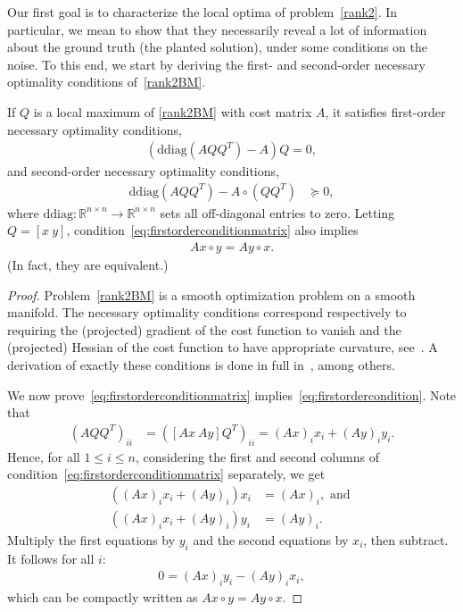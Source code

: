 \documentclass{colt2016} %
\newcommand{\Rnn}{{\mathbb{R}^{n\times n}}}
\newcommand{\1}{\mathbf{1}}
\newcommand{\ddiag}{\mathrm{ddiag}}
\begin{document}

Our first goal is to characterize the local optima of problem~\eqref{rank2}. In particular, we mean to show that they necessarily reveal a lot of information about the ground truth (the planted solution), under some conditions on the noise. To this end, we start by deriving the first- and second-order necessary optimality conditions of~\eqref{rank2BM}.

\begin{lemma} \label{lem:optimality}
	If $Q$ is a local maximum of \eqref{rank2BM} with cost matrix $A$, it satisfies first-order necessary optimality conditions,
	\begin{align}
	\left( \ddiag(AQQ^T) - A \right)Q = 0,
	\label{eq:firstorderconditionmatrix}
	\end{align}
	and second-order necessary optimality conditions,
	\begin{align}
	\ddiag(AQQ^T) - A\circ(QQ^T) & \succeq 0,
	\label{eq:secondorderconditionmatrix}
	\end{align}
	where $\ddiag \colon \Rnn \to \Rnn$ sets all off-diagonal entries to zero. Letting $Q = [x \ y]$, condition~\eqref{eq:firstorderconditionmatrix} also implies
	\begin{align}\label{eq:firstordercondition}
		Ax \circ y = Ay \circ x.
	\end{align}
	(In fact, they are equivalent.)
\end{lemma}
\begin{proof}
	Problem~\eqref{rank2BM} is a smooth optimization problem on a smooth manifold.
	The necessary optimality conditions correspond respectively to requiring the (projected) gradient of the cost function to vanish and the (projected) Hessian of the cost function to have appropriate curvature, see~\citep[eqs.(3.37,5.15)]{AMS08}. A derivation of exactly these conditions is done in full in~\citep{journee2010low,boumal2015staircase}, among others.
	
	We now prove~\eqref{eq:firstorderconditionmatrix} implies~\eqref{eq:firstordercondition}. Note that
	\begin{align*}
		(AQQ^T)_{ii} & = ([Ax \ Ay] Q^T)_{ii} = (Ax)_i x_i + (Ay)_i y_i.
	\end{align*}
	Hence, for all $1 \leq i \leq n$, considering the first and second columns of condition~\eqref{eq:firstorderconditionmatrix} separately, we get
	\begin{align*}
		((Ax)_i x_i + (Ay)_i)x_i & = (Ax)_i, \textrm{ and }\\
		((Ax)_i x_i + (Ay)_i)y_i & = (Ay)_i.
	\end{align*}
	Multiply the first equations by $y_i$ and the second equations by $x_i$, then subtract. It follows for all $i$:
	\begin{align*}
		0 = (Ax)_i y_i - (Ay)_i x_i,
	\end{align*}
	which can be compactly written as $Ax \circ y = Ay \circ x$.
\end{proof}
\end{document}
